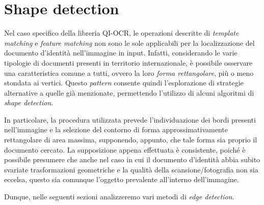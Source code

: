 \section{Shape detection}
\label{sec:shape-detection}
Nel caso specifico della libreria QI-OCR, le operazioni descritte di \textit{template matching} e \textit{feature matching} non sono le sole applicabili per la localizzazione del documento d'identit\`a nell'immagine in input. Infatti, considerando le varie tipologie di documenti presenti in territorio internazionale, \`e possibile osservare una caratteristica comune a tutti, ovvero la loro \textit{forma rettangolare}, pi\`u o meno stondata ai vertici. Questo \textit{pattern} consente quindi l'esplorazione di strategie alternative a quelle gi\`a menzionate, permettendo l'utilizzo di alcuni algoritmi di \textit{shape detection}.\par
In particolare, la procedura utilizzata prevede l'individuazione dei bordi presenti nell'immagine e la selezione del contorno di forma approssimativamente rettangolare di area massima, supponendo, appunto, che tale forma sia proprio il documento cercato. La supposizione appena effettuata \`e consistente, poich\'e \`e possibile presumere che anche nel caso in cui il documento d'identit\`a abbia subito svariate trasformazioni geometriche e la qualit\`a della scansione/fotografia non sia eccelsa, questo sia comunque l'oggetto prevalente all'interno dell'immagine.\par
Dunque, nelle seguenti sezioni analizzeremo vari metodi di \textit{edge detection}.

